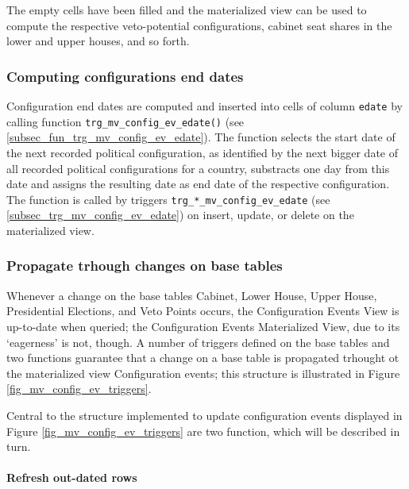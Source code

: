 The empty cells have been filled and the materialized view can be used to compute the respective veto-potential configurations, cabinet seat shares in the lower and upper houses, and so forth.

\subsubsection{Computing configurations end dates}
Configuration end dates are computed and inserted into cells of column \texttt{edate} by calling function \texttt{trg\_mv\_config\_ev\_edate()} (see \ref{subsec_fun_trg_mv_config_ev_edate}).
The function selects the start date of the next recorded political configuration, as identified by the next bigger date of all recorded political configurations for a country, substracts one day from this date and assigns the resulting date as end date of the respective configuration.
The function is called by triggers \texttt{trg\_*\_mv\_config\_ev\_edate} (see \ref{subsec_trg_mv_config_ev_edate}) on insert, update, or delete on the materialized view.

\subsubsection{Propagate trhough changes on base tables}\label{subsubsec_trigger_structure_mv_config_ev}

Whenever a change on the base tables Cabinet, Lower House, Upper House, Presidential Elections, and Veto Points occurs, the Configuration Events View is up-to-date when queried; the Configuration Events Materialized View, due to its `eagerness' is not, though.
A number of triggers defined on the base tables and two functions guarantee that a change on a base table is propagated trhought ot the materialized view Configuration events; this structure is illustrated in Figure \ref{fig_mv_config_ev_triggers}.

\label{fig_mv_config_ev_triggers}

Central to the structure implemented to update configuration events displayed in Figure \ref{fig_mv_config_ev_triggers} are two function, which will be described in turn.

\paragraph{Refresh out-dated rows}

